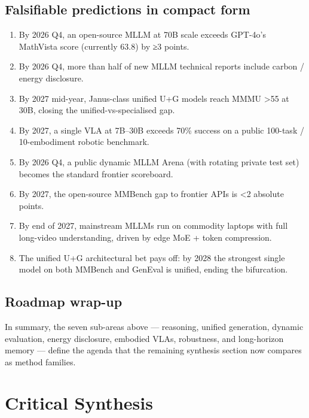 \subsection{Falsifiable predictions in compact form}\label{falsifiable-predictions-in-compact-form}

\begin{enumerate}
\def\labelenumi{\arabic{enumi}.}
\tightlist
\item
  By 2026 Q4, an open-source MLLM at 70B scale exceeds GPT-4o's MathVista score (currently 63.8) by ≥3 points.
\item
  By 2026 Q4, more than half of new MLLM technical reports include carbon / energy disclosure.
\item
  By 2027 mid-year, Janus-class unified U+G models reach MMMU \textgreater55 at 30B, closing the unified-vs-specialised gap.
\item
  By 2027, a single VLA at 7B--30B exceeds 70\% success on a public 100-task / 10-embodiment robotic benchmark.
\item
  By 2026 Q4, a public dynamic MLLM Arena (with rotating private test set) becomes the standard frontier scoreboard.
\item
  By 2027, the open-source MMBench gap to frontier APIs is \textless2 absolute points.
\item
  By end of 2027, mainstream MLLMs run on commodity laptops with full long-video understanding, driven by edge MoE + token compression.
\item
  The unified U+G architectural bet pays off: by 2028 the strongest single model on both MMBench and GenEval is unified, ending the bifurcation.
\end{enumerate}

\subsection{Roadmap wrap-up}\label{roadmap-wrap-up}

In summary, the seven sub-areas above --- reasoning, unified generation, dynamic evaluation, energy disclosure, embodied VLAs, robustness, and long-horizon memory --- define the agenda that the remaining synthesis section now compares as method families.

\section{Critical Synthesis}\label{critical-synthesis}

